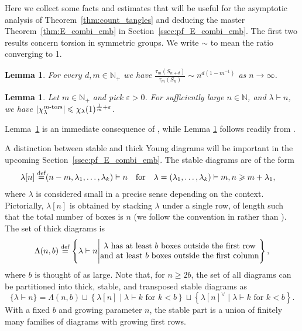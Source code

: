 \documentclass{amsart}
\newtheorem{lemma}[conjecture]{Lemma}
\newcommand{\defeq}{\stackrel{\tn{def}}{=}}
\newcommand{\tn}{\textnormal}
\begin{document}
Here we collect some facts and estimates that will be useful for the asymptotic analysis of Theorem~\ref{thm:count_tangles} and deducing the master Theorem~\ref{thm:E_combi_emb} in Section~\ref{ssec:pf_E_combi_emb}. The first two results concern torsion in symmetric groups. We write $\sim$ to mean the ratio converging to 1.
\begin{lemma}\label{lmm:Sn_tors_growth}
For every $d,m\in\mathbb{N}_+$ we have $\frac{\tau_m(S_{n+d})}{\tau_m(S_n)}\sim n^{d(1-m^{-1})}$ as $n\to\infty$.
\end{lemma}
\begin{lemma}\label{lmm:tors_avg_char}
Let $m\in\mathbb{N}_+$ and pick $\varepsilon>0$. For sufficiently large $n\in\mathbb{N}$, and $\lambda\vdash n$, we have $|\chi_\lambda^{m\tn{-tors}}|\leqslant\chi_\lambda(1)^{\frac{1}{m}+\varepsilon}$.
\end{lemma}
Lemma~\ref{lmm:Sn_tors_growth} is an immediate consequence of \cite[Theorem 6 in \S5.2(c)]{finite_gp_actions_asymptotic_expansion_ePz_Mueller97}, while Lemma \ref{lmm:tors_avg_char} follows readily from \cite[Theorem B.(ii)]{char_theory_symm_gps_subgp_growth_fuchsian_gps_random_walks_MuellerSchlagePuchta07}.

A distinction between stable and thick Young diagrams will be important in the upcoming Section~\ref{ssec:pf_E_combi_emb}. The stable diagrams are of the form
\begin{align*}
\lambda[n]\defeq&(n-m,\lambda_1,\dots,\lambda_k)\vdash n\quad\text{for}\quad\lambda=(\lambda_1,\dots,\lambda_k)\vdash m,n\geqslant m+\lambda_1,
\end{align*}
where $\lambda$ is considered small in a precise sense depending on the context. Pictorially, $\lambda[n]$ is obtained by stacking $\lambda$ under a single row, of length such that the total number of boxes is $n$ (we follow the convention in \cite{partition_alg_Kronecker_coeffs_BowmanVissherOrellana15} rather than \cite{asymptotic_stats_random_covering_surfaces_MageePuder23}). The set of thick diagrams is
\begin{equation*}
\Lambda(n,b)\defeq\left\{\lambda\vdash n\Bigg|\begin{matrix}\lambda\text{ has at least }b\text{ boxes outside the first row}\\\text{and at least }b\text{ boxes outside the first column}\end{matrix}\right\},
\end{equation*}
where $b$ is thought of as large. Note that, for $n\geqslant 2b$, the set of all diagrams can be partitioned into thick, stable, and transposed stable diagrams as
\begin{equation}\label{eq:stable_thick}
\{\lambda\vdash n\}=\Lambda(n,b)\sqcup\left\{\lambda[n]\mid\lambda\vdash k\text{ for }k<b\right\}\sqcup\left\{\lambda[n]^\vee\mid\lambda\vdash k\text{ for }k<b\right\}.
\end{equation}
With a fixed $b$ and growing parameter $n$, the stable part is a union of finitely many families of diagrams with growing first rows.
\end{document}
